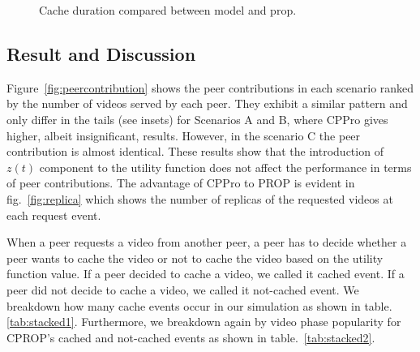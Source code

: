 \documentclass[10pt,final,journal,a4paper]{IEEEtran}
\begin{document}
\begin{figure}[!t]
\centering
{}
\hfill
{}
\hfill
{}
\vspace{2mm}
\caption{Cache duration compared between model and prop.}
\label{fig:duration}
\end{figure}




\subsection{Result and Discussion}\label{resultanddiscussion}


Figure~\ref{fig:peercontribution} shows the peer contributions in each scenario ranked by the number of videos served by each peer.
They exhibit a similar pattern and only differ in the tails (see insets) for Scenarios A and B, where CPPro gives higher, albeit insignificant, results.
However, in the scenario C the peer contribution is almost identical.
These results show that the introduction of $z(t)$ component to the utility function does not affect the performance in terms of peer contributions.
The advantage of CPPro to PROP is evident in fig.~\ref{fig:replica} which shows the number of replicas of the requested videos at each request event.



When a peer requests a video from another peer, a peer has to decide whether a peer wants to cache the video or not to cache the video based on the utility function value.  
If a peer decided to cache a video, we called it cached event.
If a peer did not decide to cache a video, we called it not-cached event.
We breakdown how many cache events occur in our simulation as shown in table.\ref{tab:stacked1}.
Furthermore, we breakdown again by video phase popularity for CPROP's cached and not-cached events as shown in table.~\ref{tab:stacked2}.
\end{document}
